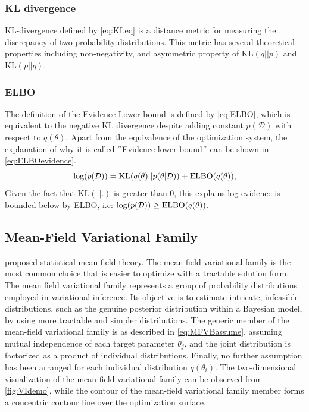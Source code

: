 \subsubsection{KL divergence}
KL-divergence defined by \autoref{eq:KLeq} is a distance metric for measuring the discrepancy of two probability distributions. This metric has several theoretical properties including non-negativity, and asymmetric property of KL$(q||p)$ and KL$(p||q)$.

\subsubsection{ELBO}
The definition of the Evidence Lower bound is defined by \autoref{eq:ELBO}, which is equivalent to the negative KL divergence despite adding constant $p(\mathcal{D})$ with respect to $q(\theta)$. 
Apart from the equivalence of the optimization system, the explanation of why it is called $"$Evidence lower bound$"$ can be shown in \autoref{eq:ELBOevidence}.
\begin{equation}
	\label{eq:ELBOevidence}
	\textnormal{log}(p(\mathcal{D})) = \text{KL}(q(\theta)||p(\theta|\mathcal{D})) + \text{ELBO}(q(\theta)),
\end{equation}
Given the fact that KL$(.|.)$ is greater than 0, this explains log evidence is bounded below by ELBO, i.e: $\textnormal{log}(p(\mathcal{D})) \geq \text{ELBO}(q(\theta))$.

\subsection{Mean-Field Variational Family} 
\cite{parisi1988statistical} proposed statistical mean-field theory. The mean-field variational family is the most common choice that is easier to optimize with a tractable solution form.
The mean field variational family represents a group of probability distributions employed in variational inference. Its objective is to estimate intricate, infeasible distributions, such as the genuine posterior distribution within a Bayesian model, by using more tractable and simpler distributions.
The generic member of the mean-field variational family is as described in \autoref{eq:MFVBassume}, assuming mutual independence of each target parameter $\theta_j$, and the joint distribution is factorized as a product of individual distributions. Finally, no further assumption has been arranged for each individual distribution $q(\theta_i)$.
The two-dimensional visualization of the mean-field variational family can be observed from \autoref{fig:VIdemo}, while the contour of the mean-field variational family member forms a concentric contour line over the optimization surface.




